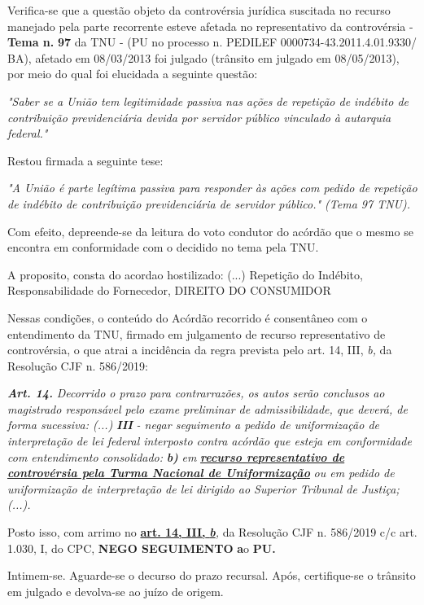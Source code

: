 \documentclass[12pt]{article}
\begin{document}
\justifying
\noindent Verifica-se que a questão objeto da controvérsia jurídica suscitada no recurso manejado pela parte recorrente esteve afetada no representativo da controvérsia - \textbf{Tema n. }\textbf{97} da TNU - (PU no processo n. PEDILEF 0000734-43.2011.4.01.9330/ BA),  afetado em 08/03/2013 foi julgado (trânsito em julgado em 08/05/2013), por meio do qual foi elucidada a seguinte questão:

\noindent \textit{"Saber se a União tem legitimidade passiva nas ações de repetição de indébito de contribuição previdenciária devida por servidor público vinculado à autarquia federal."}

\noindent Restou firmada a seguinte tese:

\noindent \textit{"A União é parte legítima passiva para responder às ações com pedido de repetição de indébito de contribuição previdenciária de servidor público." (Tema 97 TNU).}

\noindent Com efeito, depreende-se da leitura do voto condutor do acórdão que o mesmo se encontra em conformidade com o decidido no  tema pela TNU.

\noindent A proposito, consta do acordao hostilizado: (...) Repetição do Indébito, Responsabilidade do Fornecedor, DIREITO DO CONSUMIDOR

\noindent Nessas condições, o conteúdo do Acórdão recorrido é consentâneo com o entendimento da TNU, firmado em julgamento de recurso representativo de controvérsia, o que atrai a incidência da regra prevista pelo art. 14, III, \textit{b,} da Resolução CJF n. 586/2019:

\noindent \textit{\textbf{Art. 14.}}\textit{ Decorrido o prazo para contrarrazões, os autos serão conclusos ao magistrado responsável pelo exame preliminar de admissibilidade, que deverá, de forma sucessiva: (...) }\textit{\textbf{III }}\textit{- negar seguimento a pedido de uniformização de interpretação de lei federal interposto contra acórdão que esteja em conformidade com entendimento consolidado: }\textit{\textbf{b)}}\textit{ em }\uline{\textit{\textbf{recurso representativo de controvérsia pela Turma Nacional de Uniformização}}}\textit{ ou em pedido de uniformização de interpretação de lei dirigido ao Superior Tribunal de Justiça;(...).}

\noindent Posto isso, com arrimo no \uline{\textbf{art. 14, III, }}\uline{\textit{\textbf{b}}}\textit{,} da Resolução CJF n. 586/2019 c/c art. 1.030, I, do CPC, \textbf{NEGO SEGUIMENTO }\textbf{a}o\textbf{ PU}\textbf{.}

\noindent Intimem-se. Aguarde-se o decurso do prazo recursal. Após, certifique-se o trânsito em julgado e devolva-se ao juízo de origem.
\end{document}

